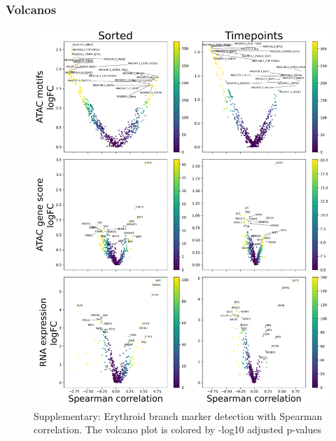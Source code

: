 \documentclass[a4paper]{article}
\begin{document}
\FloatBarrier
\subsubsection{Volcanos}

\begin{figure}[!htb]
  \centering
  \includegraphics[width=\textwidth]{../figures/hematopoiesis/Erythroid_40_103_smooth_none_single_branch_volcanos_motifs.png}
  \caption{Supplementary: Erythroid branch marker detection with Spearman correlation. The volcano plot is colored by -log10 adjusted p-values}
\end{figure}
\end{document}
